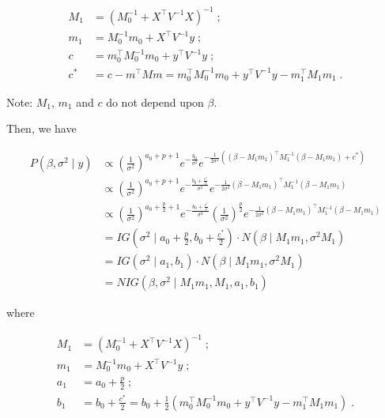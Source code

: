 \documentclass[
]{book}
\theoremstyle{definition}
\theoremstyle{definition}
\theoremstyle{definition}
\theoremstyle{definition}
\theoremstyle{remark}
\begin{document}
\begin{align}
 M_{1} &= (M_{0}^{-1} + X^{\top}V^{-1}X)^{-1}\;; \\
 m_{1} &= M_{0}^{-1}m_{0} + X^{\top}V^{-1}y\;; \\
 c &= m_{0}^{\top} M_{0}^{-1}m_{0} + y^{\top}V^{-1}y\;; \\
  c^{\ast} &= c - m^{\top}Mm = m_{0}^{\top} M_{0}^{-1}m_{0} + y^{\top}V^{-1}y - m_{1}^{\top}M_{1}m_{1}\; .
\end{align}

Note: \(M_{1}\), \(m_{1}\) and \(c\) do not depend upon \(\beta\).

Then, we have

\begin{align}
P\left(\beta, \sigma^{2} \mid y\right) & \propto \left(\frac{1}{\sigma^{2}}\right)^{a_{0}+p+1} e^{-\frac{b_{0}}{\sigma^{2}}} 
e^{-\frac{1}{2 \sigma^{2}} ((\beta - M_{1}m_{1})^{\top}M_{1}^{-1}(\beta - M_{1}m_{1}) +c^{\ast})}\\
& \propto \left(\frac{1}{\sigma^{2}}\right)^{a_{0}+p+1} e^{-\frac{b_{0}+\frac{c^{\ast}}{2}}{\sigma^{2}}} 
e^{-\frac{1}{2 \sigma^{2}} (\beta - M_{1}m_{1})^{\top}M_{1}^{-1}(\beta - M_{1}m_{1})}\\
& \propto \left(\frac{1}{\sigma^{2}}\right)^{a_{0}+\frac{p}{2}+1} e^{-\frac{b_{0}+\frac{c^{\ast}}{2}}{\sigma^{2}}} 
(\frac{1}{\sigma^2})^{\frac{p}{2}}
e^{-\frac{1}{2 \sigma^{2}} (\beta - M_{1}m_{1})^{\top}M_{1}^{-1}(\beta - M_{1}m_{1})}\\
&= IG\left(\sigma^{2} \mid a_{0}+\frac{p}{2}, b_{0}+\frac{c^{\ast}}{2} \right) \cdot N\left(\beta \mid M_{1}m_{1}, \sigma^{2} M_{1}\right) \\
&= IG\left(\sigma^{2} \mid a_{1}, b_{1} \right) \cdot N\left(\beta \mid M_{1}m_{1}, \sigma^{2} M_{1}\right) \\
&= NIG\left(\beta, \sigma^{2} \mid M_{1}m_{1}, M_{1}, a_{1}, b_{1}\right) \;
\end{align}

where

\begin{align}
M_{1} &= (M_{0}^{-1}+X^{\top} V^{-1} X)^{-1} \;; \\
m_{1}&=M_{0}^{-1} m_{0}+X^{\top} V^{-1} y \;; \\
a_{1}&=a_{0}+\frac{p}{2} \;; \\
b_{1}&=b_{0}+\frac{c^{\ast}}{2}= b_{0}+\frac{1}{2}\left(m_{0}^{\top} M_{0}^{-1} m_{0}+y^{\top} V^{-1} y-m_{1}^{\top} M_{1} m_{1}\right)\;. 
\end{align}
\end{document}
